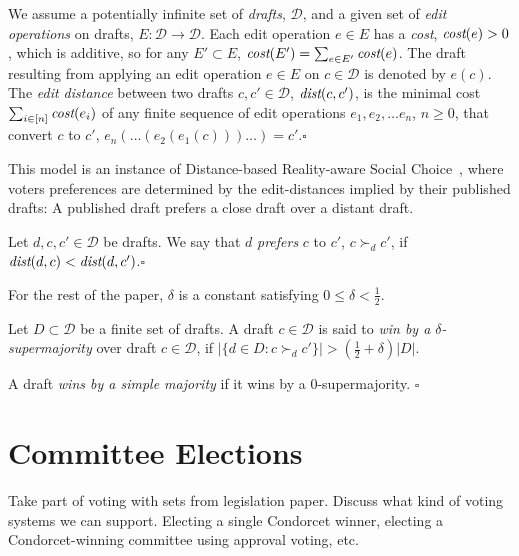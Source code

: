 \documentclass[sigconf]{aamas}  %
\newcommand{\qqed}{\hfill$\square$}
\newcommand{\calD}{\mathcal{D}}
\newcommand{\prefers}[1]{\succ_{#1}}
\newcommand{\dist}{\emph{dist}}
\newcommand{\cost}{\emph{cost}}
\begin{document}
\begin{definition}
%
We assume a potentially infinite set of \emph{drafts}, $\calD$, and a given set of \emph{edit operations} on drafts, $E: \calD \rightarrow \calD$. Each edit operation $e \in E$ has a \emph{cost}, $\cost(e) > 0$,  which is additive, so for any $E' \subset E$, $\cost(E') = \sum_{e \in E'} \cost(e)$. The draft resulting from applying an edit operation $e \in E$ on  $c \in \calD$ is denoted by $e(c)$.  The \emph{edit distance} between two drafts $c, c' \in \calD$, $\dist(c, c')$, is the minimal cost $\sum_{i \in [n]} \cost(e_i)$ of any finite sequence of edit operations $e_1, e_2, \ldots e_n$, $n \ge 0$, that convert $c$  to $c'$, $e_n(\ldots(e_2(e_1(c)))\ldots) = c'$.\qqed  
%
\end{definition}

This model is an instance of Distance-based Reality-aware Social Choice~\cite{realsoc}, where voters preferences are determined by the edit-distances implied by their published drafts:  A published draft prefers a close draft over a distant draft.

\begin{definition}[Prefers]\label{lemma:prefers}
%
Let $d, c, c' \in \calD$ be drafts.  We say that  $d$ \emph{prefers}  $c$ to $c'$, $ c \prefers{d} c'$, if $\dist(d, c) < \dist(d, c')$.\qqed
\end{definition}


For the rest of the paper, $\delta$ is a constant satisfying $0 \le \delta < \frac{1}{2}$.

\begin{definition}
%
Let $D \subset \calD$ be a finite set of drafts. A draft $c \in \calD$ is said to \emph{win by a $\delta$-supermajority} over draft  $c \in \calD$, if $|\{ d \in D : c \prefers{d} c' \}|  > (\frac{1}{2}+\delta) |D|$.


A draft \emph{wins by a simple majority} if it wins by a $0$-supermajority.
%
\qqed\end{definition}


\section{Committee Elections}

Take part of voting with sets from legislation paper.
Discuss what kind of voting systems we can support.
Electing a single Condorcet winner, electing a Condorcet-winning committee using approval voting, etc.
\end{document}
